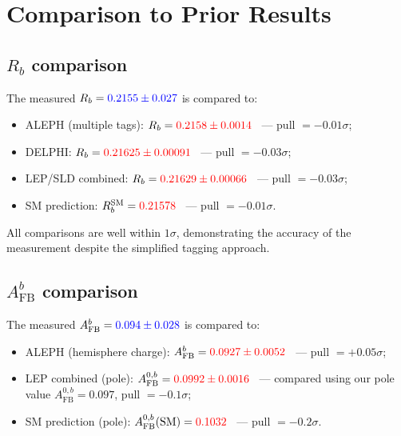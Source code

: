 \documentclass[11pt,a4paper]{article}
\newcommand{\measured}[1]{\textcolor{blue}{#1}}
\newcommand{\external}[1]{\textcolor{red}{#1}}
\begin{document}
\section{Comparison to Prior Results}
\label{sec:comparison}

\subsection{$R_b$ comparison}

The measured $R_b = \measured{0.2155 \pm 0.027}$ is compared to:
\begin{itemize}
\item ALEPH (multiple tags): $R_b = \external{0.2158 \pm 0.0014}$~\cite{ALEPH:Rb:1996} --- pull $= -0.01\sigma$;
\item DELPHI: $R_b = \external{0.21625 \pm 0.00091}$~\cite{DELPHI:Rb} --- pull $= -0.03\sigma$;
\item LEP/SLD combined: $R_b = \external{0.21629 \pm 0.00066}$~\cite{LEP:EWWG:2005} --- pull $= -0.03\sigma$;
\item SM prediction: $R_b^\mathrm{SM} = \external{0.21578}$~\cite{LEP:EWWG:2005} --- pull $= -0.01\sigma$.
\end{itemize}

All comparisons are well within $1\sigma$, demonstrating the accuracy of
the measurement despite the simplified tagging approach.

\subsection{$A_\mathrm{FB}^b$ comparison}

The measured $A_\mathrm{FB}^b = \measured{0.094 \pm 0.028}$ is compared to:
\begin{itemize}
\item ALEPH (hemisphere charge): $A_\mathrm{FB}^b = \external{0.0927 \pm 0.0052}$~\cite{ALEPH:AFBb} --- pull $= +0.05\sigma$;
\item LEP combined (pole): $A_\mathrm{FB}^{0,b} = \external{0.0992 \pm 0.0016}$~\cite{LEP:EWWG:2005} --- compared using our pole value $A_\mathrm{FB}^{0,b} = 0.097$, pull $= -0.1\sigma$;
\item SM prediction (pole): $A_\mathrm{FB}^{0,b}(\mathrm{SM}) = \external{0.1032}$~\cite{LEP:EWWG:2005} --- pull $= -0.2\sigma$.
\end{itemize}
\end{document}
